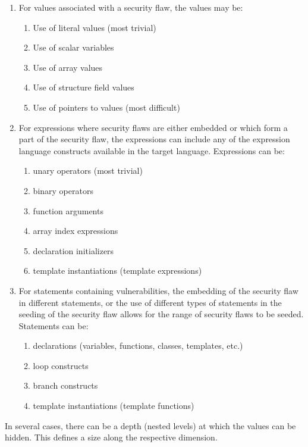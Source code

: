          \begin{enumerate}
            \item For values associated with a security flaw, the values may be:
               \begin{enumerate}
                  \item Use of literal values (most trivial)
                  \item Use of scalar variables 
                  \item Use of array values
                  \item Use of structure field values
                  \item Use of pointers to values (most difficult)
               \end{enumerate}

            \item For expressions where security flaws are either embedded or 
                  which form a part of the security flaw, the expressions can 
                  include any of the expression language constructs available
                  in the target language. Expressions can be:
               \begin{enumerate}
                  \item unary operators (most trivial)
                  \item binary operators
                  \item function arguments
                  \item array index expressions
                  \item declaration initializers
                  \item template instantiations (template expressions)
               \end{enumerate}

            \item For statements containing vulnerabilities, the embedding of 
                  the security flaw in different statements, or the use of different
                  types of statements in the seeding of the security flaw allows
                  for the range of security flaws to be seeded. Statements 
                  can be:
               \begin{enumerate}
                  \item declarations (variables, functions, classes, templates, etc.)
                  \item loop constructs
                  \item branch constructs
                  \item template instantiations (template functions)
               \end{enumerate}

         \end{enumerate}
         In several cases, there can be a depth (nested levels) at which the 
         values can be hidden.  This defines a size along the respective
         dimension.


